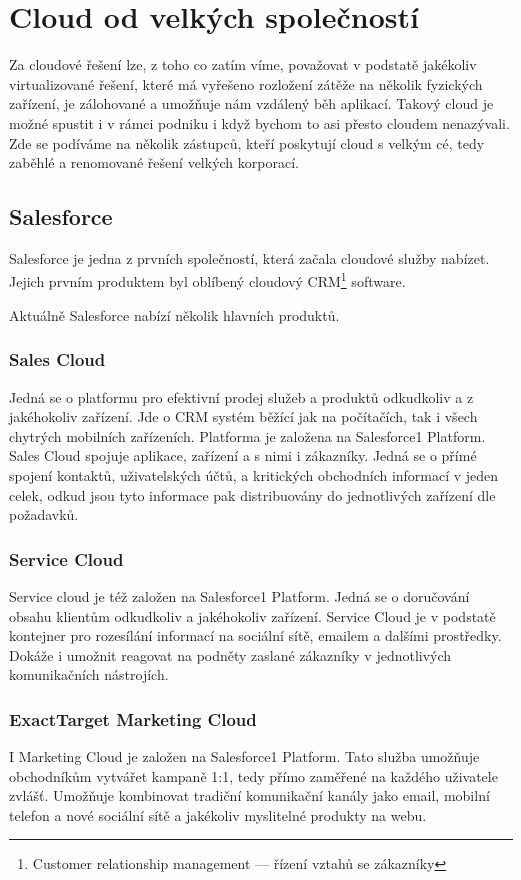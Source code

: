 \section{Cloud od velkých společností}
Za cloudové řešení lze, z toho co zatím víme, považovat v podstatě jakékoliv virtualizované řešení, které má vyřešeno rozložení zátěže na několik fyzických zařízení, je zálohované a umožňuje nám vzdálený běh aplikací. Takový cloud je možné spustit i v rámci podniku i když bychom to asi přesto cloudem nenazývali. Zde se podíváme na několik zástupců, kteří poskytují cloud s velkým cé, tedy zaběhlé a renomované řešení velkých korporací.

\subsection{Salesforce}
Salesforce je jedna z prvních společností, která začala cloudové služby nabízet. Jejich prvním produktem byl oblíbený cloudový CRM\footnote{Customer relationship management --- řízení vztahů se zákazníky} software.

Aktuálně Salesforce nabízí několik hlavních produktů.

\subsubsection{Sales Cloud}
Jedná se o platformu pro efektivní prodej služeb a produktů odkudkoliv a z jakéhokoliv zařízení. Jde o CRM systém běžící jak na počítačích, tak i všech chytrých mobilních zařízeních. Platforma je založena na Salesforce1 Platform. Sales Cloud spojuje aplikace, zařízení a s nimi i zákazníky. Jedná se o přímé spojení kontaktů, uživatelských účtů, a kritických obchodních informací v jeden celek, odkud jsou tyto informace pak distribuovány do jednotlivých zařízení dle požadavků.\nocite{salesforce:salesCloud}

\subsubsection{Service Cloud}
Service cloud je též založen na Salesforce1 Platform. Jedná se o doručování obsahu klientům odkudkoliv a jakéhokoliv zařízení. Service Cloud je v podstatě kontejner pro rozesílání informací na sociální sítě, emailem a dalšími prostředky. Dokáže i umožnit reagovat na podněty zaslané zákazníky v jednotlivých komunikačních nástrojích.\nocite{salesforce:serviceCloud}

\subsubsection{ExactTarget Marketing Cloud}
I Marketing Cloud je založen na Salesforce1 Platform. Tato služba umožňuje obchodníkům vytvářet kampaně 1:1, tedy přímo zaměřené na každého uživatele zvlášť. Umožňuje kombinovat tradiční komunikační kanály jako email, mobilní telefon a nové sociální sítě a jakékoliv myslitelné produkty na webu.\nocite{salesforce:marketingCloud}

